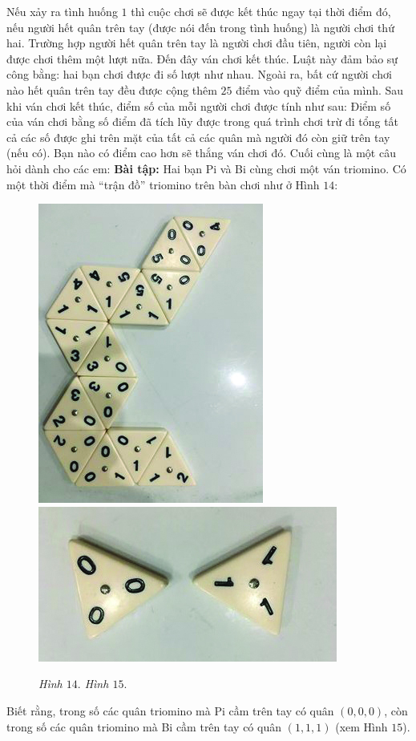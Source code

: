 {{	\vskip 0.1cm
	Nếu xảy ra tình huống $1$ thì cuộc chơi sẽ được kết thúc ngay tại thời điểm đó, nếu người hết quân trên tay (được nói đến trong tình huống) là người chơi thứ hai. Trường hợp người hết quân trên tay là người chơi đầu tiên, người còn lại được chơi thêm một lượt  nữa. Đến đây ván chơi kết thúc. Luật này đảm bảo sự công bằng: hai bạn chơi được đi số lượt như nhau. Ngoài ra, bất cứ người chơi nào hết quân trên tay đều được cộng thêm $25$ điểm vào quỹ điểm của mình.
	\vskip 0.1cm
	Sau khi ván chơi kết thúc, điểm số của mỗi người chơi được tính như sau: Điểm số của ván chơi bằng số điểm đã tích lũy được trong quá trình chơi trừ đi tổng tất cả các số được ghi trên mặt của tất cả các quân mà người đó còn giữ trên tay (nếu có). Bạn nào có điểm cao hơn sẽ thắng ván chơi đó. 
	\vskip 0.1cm
	Cuối cùng là một câu hỏi dành cho các em:
	\vskip 0.3cm
	\textbf{\color{toancuabi}Bài tập:} Hai bạn Pi và Bi cùng chơi một ván triomino. Có một thời điểm mà “trận đồ” triomino trên bàn chơi như ở Hình $14$:
	\vskip 0.1cm
	\begin{figure}[H]
		\centering
		\vspace*{-5pt}
		\captionsetup{labelformat=empty, justification=centering}
		\includegraphics[height=0.3\textwidth,angle=90]{h9}
		\includegraphics[height=0.225\textwidth]{h10}
		\caption{\textit{\small Hình $14.$ \hspace*{75pt} Hình $15.$}}
		\vspace*{-8pt}
	\end{figure}
	Biết rằng, trong số các quân triomino mà Pi cầm trên tay có quân $(0, 0, 0)$, còn trong số các quân triomino mà Bi cầm trên tay có quân $(1, 1, 1)$ (xem Hình $15$).
	\vskip 0.1cm
}}
